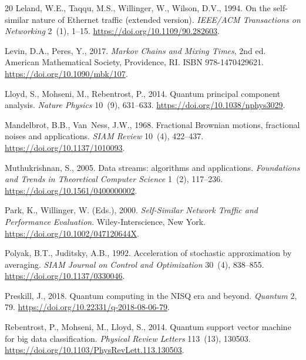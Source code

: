 \documentclass[preprint,12pt,authoryear]{elsarticle}
\begin{document}
\begin{thebibliography}{20}
Leland, W.E., Taqqu, M.S., Willinger, W., Wilson, D.V., 1994.
\newblock On the self-similar nature of Ethernet traffic (extended version).
\newblock \emph{IEEE/ACM Transactions on Networking} 2~(1), 1--15.
\newblock \url{https://doi.org/10.1109/90.282603}.

Levin, D.A., Peres, Y., 2017.
\newblock \emph{Markov Chains and Mixing Times}, 2nd ed.
\newblock American Mathematical Society, Providence, RI. ISBN 978-1470429621.
\newblock \url{https://doi.org/10.1090/mbk/107}.

Lloyd, S., Mohseni, M., Rebentrost, P., 2014.
\newblock Quantum principal component analysis.
\newblock \emph{Nature Physics} 10~(9), 631--633.
\newblock \url{https://doi.org/10.1038/nphys3029}.

Mandelbrot, B.B., Van~Ness, J.W., 1968.
\newblock Fractional Brownian motions, fractional noises and applications.
\newblock \emph{SIAM Review} 10~(4), 422--437.
\newblock \url{https://doi.org/10.1137/1010093}.

Muthukrishnan, S., 2005.
\newblock Data streams: algorithms and applications.
\newblock \emph{Foundations and Trends in Theoretical Computer Science} 1~(2), 117--236.
\newblock \url{https://doi.org/10.1561/0400000002}.

Park, K., Willinger, W. (Eds.), 2000.
\newblock \emph{Self-Similar Network Traffic and Performance Evaluation}.
\newblock Wiley-Interscience, New York.
\newblock \url{https://doi.org/10.1002/047120644X}.

Polyak, B.T., Juditsky, A.B., 1992.
\newblock Acceleration of stochastic approximation by averaging.
\newblock \emph{SIAM Journal on Control and Optimization} 30~(4), 838--855.
\newblock \url{https://doi.org/10.1137/0330046}.

Preskill, J., 2018.
\newblock Quantum computing in the NISQ era and beyond.
\newblock \emph{Quantum} 2, 79.
\newblock \url{https://doi.org/10.22331/q-2018-08-06-79}.

Rebentrost, P., Mohseni, M., Lloyd, S., 2014.
\newblock Quantum support vector machine for big data classification.
\newblock \emph{Physical Review Letters} 113~(13), 130503.
\newblock \url{https://doi.org/10.1103/PhysRevLett.113.130503}.


\end{thebibliography}
\end{document}
